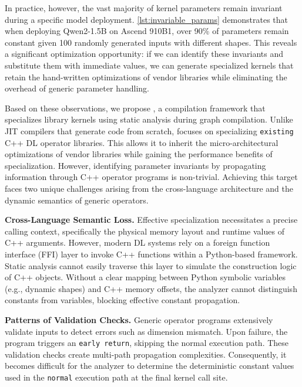 

In practice, however, the vast majority of kernel parameters remain invariant during a specific model deployment.
\autoref{lst:invariable_params} demonstrates that when deploying Qwen2-1.5B on Ascend 910B1, over 90\% of parameters remain constant given 100 randomly generated inputs with different shapes.
This reveals a significant optimization opportunity: if we can identify these invariants and substitute them with immediate values, we can generate specialized kernels that retain the hand-written optimizations of vendor libraries while eliminating the overhead of generic parameter handling.

Based on these observations, we propose \mysys, a compilation framework that specializes library kernels using static analysis during graph compilation.
Unlike JIT compilers that generate code from scratch, \mysys focuses on specializing \texttt{existing} C++ DL operator libraries.
This allows it to inherit the micro-architectural optimizations of vendor libraries while gaining the performance benefits of specialization.
However, identifying parameter invariants by propagating information through C++ operator programs is non-trivial. 
Achieving this target faces two unique challenges arising from the cross-language architecture and the dynamic semantics of generic operators.

\textbf{Cross-Language Semantic Loss.} 
Effective specialization necessitates a precise calling context, specifically the physical memory layout and runtime values of C++ arguments. 
However, modern DL systems rely on a foreign function interface (FFI) layer to invoke C++ functions within a Python-based framework.
Static analysis cannot easily traverse this layer to simulate the construction logic of C++ objects.
Without a clear mapping between Python symbolic variables (e.g., dynamic shapes) and C++ memory offsets, the analyzer cannot distinguish constants from variables, blocking effective constant propagation.

\textbf{Patterns of Validation Checks.}
Generic operator programs extensively validate inputs to detect errors such as dimension mismatch.
Upon failure, the program triggers an \texttt{early return}, skipping the normal execution path.
These validation checks create multi-path propagation complexities.
Consequently, it becomes difficult for the analyzer to determine the deterministic constant values used in the \texttt{normal} execution path at the final kernel call site.

